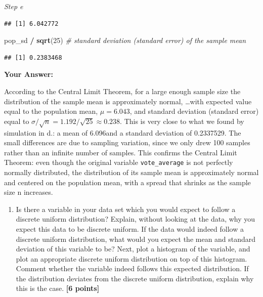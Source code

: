 \documentclass[
]{article}
\newenvironment{Shaded}{\begin{snugshade}}{\end{snugshade}}
\newcommand{\CommentTok}[1]{\textcolor[rgb]{0.56,0.35,0.01}{\textit{#1}}}
\newcommand{\DecValTok}[1]{\textcolor[rgb]{0.00,0.00,0.81}{#1}}
\newcommand{\FunctionTok}[1]{\textcolor[rgb]{0.13,0.29,0.53}{\textbf{#1}}}
\newcommand{\NormalTok}[1]{#1}
\newcommand{\OtherTok}[1]{\textcolor[rgb]{0.56,0.35,0.01}{#1}}
\newcommand{\SpecialCharTok}[1]{\textcolor[rgb]{0.81,0.36,0.00}{\textbf{#1}}}
\providecommand{\tightlist}{%
  \setlength{\itemsep}{0pt}\setlength{\parskip}{0pt}}
\begin{document}
\emph{Step e}

\begin{Shaded}
\end{Shaded}

\begin{verbatim}
## [1] 6.042772
\end{verbatim}

\begin{Shaded}
\begin{Highlighting}[]
\NormalTok{pop\_sd }\SpecialCharTok{/} \FunctionTok{sqrt}\NormalTok{(}\DecValTok{25}\NormalTok{)            }\CommentTok{\# standard deviation (standard error) of the sample mean}
\end{Highlighting}
\end{Shaded}

\begin{verbatim}
## [1] 0.2383468
\end{verbatim}

\textbf{Your Answer:}

According to the Central Limit Theorem, for a large enough sample size
the distribution of the sample mean is approximately normal, \ldots with
expected value equal to the population mean, \(\mu = 6.043\), and
standard deviation (standard error) equal to
\(\sigma / \sqrt{n} = 1.192 / \sqrt{25} \approx 0.238\). This is very
close to what we found by simulation in d.: a mean of 6.096and a
standard deviation of 0.2337529. The small differences are due to
sampling variation, since we only drew 100 samples rather than an
infinite number of samples. This confirms the Central Limit Theorem:
even though the original variable \texttt{vote\_average} is not
perfectly normally distributed, the distribution of its sample mean is
approximately normal and centered on the population mean, with a spread
that shrinks as the sample size n increases.

\begin{enumerate}
\def\labelenumi{\arabic{enumi}.}
\setcounter{enumi}{2}
\tightlist
\item
  Is there a variable in your data set which you would expect to follow
  a discrete uniform distribution? Explain, without looking at the data,
  why you expect this data to be discrete uniform. If the data would
  indeed follow a discrete uniform distribution, what would you expect
  the mean and standard deviation of this variable to be? Next, plot a
  histogram of the variable, and plot an appropriate discrete uniform
  distribution on top of this histogram. Comment whether the variable
  indeed follows this expected distribution. If the distribution
  deviates from the discrete uniform distribution, explain why this is
  the case. \textbf{[6 points]}
\end{enumerate}
\end{document}
